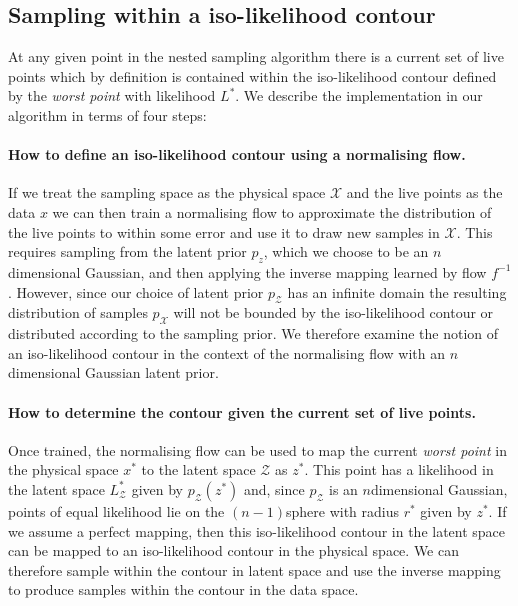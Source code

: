 \documentclass[%
 reprint,
nofootinbib,
 amsmath,amssymb,
 aps,
 prd,
]{revtex4-2}
\newcommand{\nsphere}[1]{$#1$\nobreakdash\discretionary{-}{-}{-}sphere }
\newcommand{\ndimensional}[1]{$#1$\nobreakdash\discretionary{-}{-}{-}dimensional}
\newcommand{\latent}{\mathcal{Z}}
\newcommand{\physical}{\mathcal{X}}
\begin{document}
\subsection{Sampling within a iso-likelihood contour}\label{sec:sampling}

At any given point in the nested sampling algorithm there is a current set of live points which by definition is contained within the iso-likelihood contour defined by the \textit{worst point} with likelihood $L^{*}$. We describe the implementation in our algorithm in terms of four steps:


\paragraph{How to define an iso-likelihood contour using a normalising flow.} 

If we treat the sampling space as the physical space $\physical$ and the live points as the data $x$ we can then train a normalising flow to approximate the distribution of the live points to within some error and use it to draw new samples in $\physical$. This requires sampling from the latent prior $p_z$, which we choose to be an \ndimensional{n} Gaussian, and then applying the inverse mapping learned by flow $f^{-1}$. However, since our choice of latent prior $p_{\latent}$ has an infinite domain the resulting distribution of samples $p_{\physical}$ will not be bounded by the iso-likelihood contour or distributed according to the sampling prior. We therefore examine the notion of an iso-likelihood contour in the context of the normalising flow with an \ndimensional{n} Gaussian latent prior.

\paragraph{How to determine the contour given the current set of live points.} 

Once trained, the normalising flow can be used to map the current \textit{worst point} in the physical space $x^{*}$ to the latent space $\latent$ as $z^{*}$. This point has a likelihood in the latent space $L_{\latent}^{*}$ given by $p_\latent(z^*)$ and, since $p_\latent$ is an \ndimensional{n} Gaussian, points of equal likelihood lie on the \nsphere{(n-1)} with radius $r^{*}$ given by $z^{*}$. If we assume a perfect mapping, then this iso-likelihood contour in the latent space can be mapped to an iso-likelihood contour in the physical space. We can therefore sample within the contour in latent space and use the inverse mapping to produce samples within the  contour in the data space.
\end{document}
